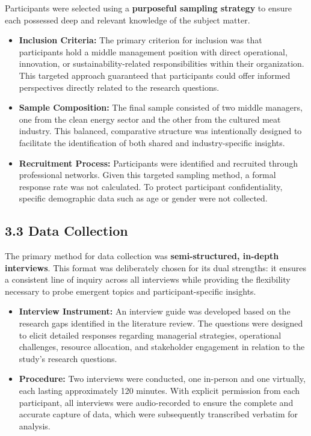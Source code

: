 Participants were selected using a \textbf{purposeful sampling strategy} to ensure each possessed deep and relevant knowledge of the subject matter. 
\begin{itemize}
	\item \textbf{Inclusion Criteria:} The primary criterion for inclusion was that participants hold a middle management position with direct operational, innovation, or sustainability-related responsibilities within their organization. This targeted approach guaranteed that participants could offer informed perspectives directly related to the research questions.
	\item \textbf{Sample Composition:} The final sample consisted of two middle managers, one from the clean energy sector and the other from the cultured meat industry. This balanced, comparative structure was intentionally designed to facilitate the identification of both shared and industry-specific insights.
	\item \textbf{Recruitment Process:} Participants were identified and recruited through professional networks. Given this targeted sampling method, a formal response rate was not calculated. To protect participant confidentiality, specific demographic data such as age or gender were not collected.
\end{itemize}

\subsection*{3.3 Data Collection}

The primary method for data collection was \textbf{semi-structured, in-depth interviews}. This format was deliberately chosen for its dual strengths: it ensures a consistent line of inquiry across all interviews while providing the flexibility necessary to probe emergent topics and participant-specific insights.
\begin{itemize}
	\item \textbf{Interview Instrument:} An interview guide was developed based on the research gaps identified in the literature review. The questions were designed to elicit detailed responses regarding managerial strategies, operational challenges, resource allocation, and stakeholder engagement in relation to the study's research questions.
	\item \textbf{Procedure:} Two interviews were conducted, one in-person and one virtually, each lasting approximately 120 minutes. With explicit permission from each participant, all interviews were audio-recorded to ensure the complete and accurate capture of data, which were subsequently transcribed verbatim for analysis.
\end{itemize}

